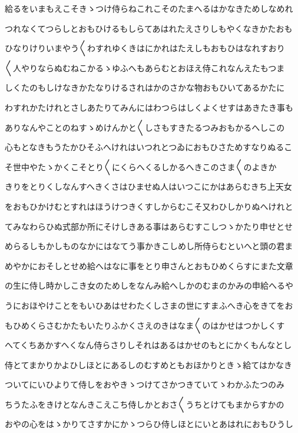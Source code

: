 \documentclass[a4paper,11pt,landscape]{ltjtarticle}
\begin{document}
給るをいまもえこそきゝつけ侍らねこれこそのたまへるはかなきためしなめれ
\par\medskip
つれなくてつらしとおもひけるもしらてあはれたえさりしもやくなきかたおも
\par\medskip
ひなりけりいまやう〱わすれゆくきはにかれはたえしもおもひはなれすおり
\par\medskip
〱人やりならぬむねこかるゝゆふへもあらむとおほえ侍これなんえたもつま
\par\medskip
しくたのもしけなきかたなりけるされはかのさかな物おもひいてあるかたに
\par\medskip
わすれかたけれとさしあたりてみんにはわつらはしくよくせすはあきたき事も
\par\medskip
ありなんやことのねすゝめけんかと〱しさもすきたるつみおもかるへしこの
\par\medskip
心もとなきもうたかひそふへけれはいつれとつゐにおもひさためすなりぬるこ
\par\medskip
そ世中やたゝかくこそとり〱にくらへくるしかるへきこのさま〱のよきか
\par\medskip
きりをとりくしなんすへきくさはひませぬ人はいつこにかはあらむきち上天女
\par\medskip
をおもひかけむとすれはほうけつきくすしからむこそ又わひしかりぬへけれと
\par\medskip
てみなわらひぬ式部か所にそけしきある事はあらむすこしつゝかたり申せとせ
\par\medskip
めらるしもかしものなかにはなてう事かきこしめし所侍らむといへと頭の君ま
\par\medskip
めやかにおそしとせめ給へはなに事をとり申さんとおもひめくらすにまた文章
\par\medskip
の生に侍し時かしこき女のためしをなんみ給へしかのむまのかみの申給へるや
\par\medskip
うにおほやけことをもいひあはせわたくしさまの世にすまふへき心をきてをお
\par\medskip
もひめくらさむかたもいたりふかくさえのきはなま〱のはかせはつかしくす
\par\medskip
へてくちあかすへくなん侍らさりしそれはあるはかせのもとにかくもんなとし
\par\medskip
侍とてまかりかよひしほとにあるしのむすめともおほかりときゝ給てはかなき
\par\medskip
ついてにいひよりて侍しをおやきゝつけてさかつきていてゝわかふたつのみ
\par\medskip
ちうたふをきけとなんきこえこち侍しかとおさ〱うちとけてもまからすかの
\par\medskip
おやの心をはゝかりてさすかにかゝつらひ侍しほとにいとあはれにおもひうし
\end{document}
